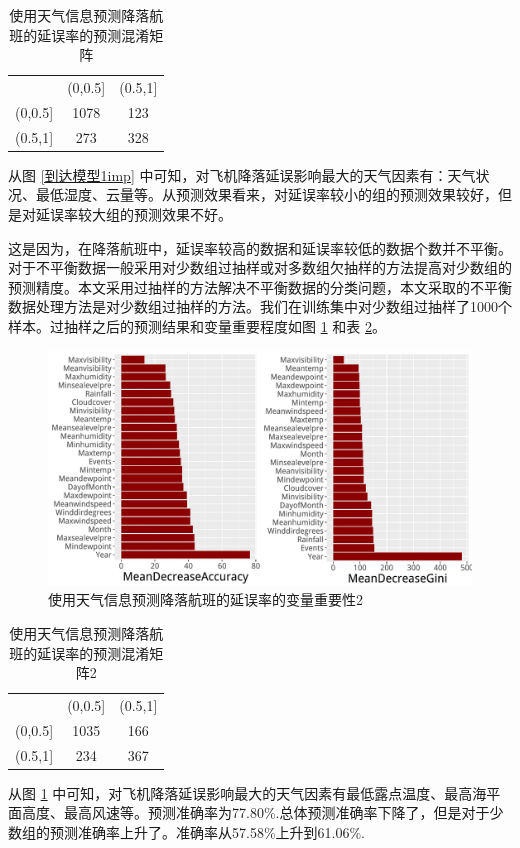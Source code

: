 \documentclass[12pt,a4paper,onecolumn]{article}
\begin{document}
\begin{table}[H]
	\centering
	\caption{使用天气信息预测降落航班的延误率的预测混淆矩阵}
	\begin{tabular}{ccc}
		\hline
		     &  (0,0.5]  & (0.5,1]  \\
	     (0,0.5] & 1078 & 123   \\
		 (0.5,1] & 273 & 328   \\\hline
	\end{tabular}
	\label{到达模型1}
\end{table}

从图 \ref{到达模型1imp} 中可知，对飞机降落延误影响最大的天气因素有：天气状况、最低湿度、云量等。从预测效果看来，对延误率较小的组的预测效果较好，但是对延误率较大组的预测效果不好。

这是因为，在降落航班中，延误率较高的数据和延误率较低的数据个数并不平衡。对于不平衡数据一般采用对少数组过抽样或对多数组欠抽样的方法提高对少数组的预测精度。本文采用过抽样的方法解决不平衡数据的分类问题，本文采取的不平衡数据处理方法是对少数组过抽样的方法。我们在训练集中对少数组过抽样了1000个样本。过抽样之后的预测结果和变量重要程度如图 \ref{到达模型11imp} 和表 \ref{到达模型11}。

\begin{figure}[H]
	\centering
	\includegraphics[width=400pt]{到达模型11imp.pdf}
	\caption{使用天气信息预测降落航班的延误率的变量重要性2}
	\label{到达模型11imp}
\end{figure}

\begin{table}[H]
	\centering
	\caption{使用天气信息预测降落航班的延误率的预测混淆矩阵2}
	\begin{tabular}{ccc}
		\hline
		    &  (0,0.5]  & (0.5,1]  \\
	     (0,0.5] & 1035 & 166  \\
		 (0.5,1] & 234 & 367   \\\hline
	\end{tabular}
	\label{到达模型11}
\end{table}

从图 \ref{到达模型11imp} 中可知，对飞机降落延误影响最大的天气因素有最低露点温度、最高海平面高度、最高风速等。预测准确率为77.80\%.总体预测准确率下降了，但是对于少数组的预测准确率上升了。准确率从57.58\%上升到61.06\%.
\end{document}
